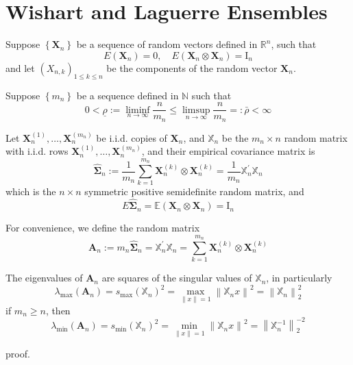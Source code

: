 \chapter{Wishart and Laguerre Ensembles}

Suppose $\left\{\mathbf{X}_{n}\right\}$ be a sequence of random vectors defined in $\mathbb{R}^{n}$, such that
\begin{equation}
    E\left(\mathbf{X}_{n}\right)=0,\quad E\left(\mathbf{X}_{n} \otimes \mathbf{X}_{n}\right)=\mathrm{I}_{n}
\end{equation}
and let $\left(X_{n,k}\right)_{1\leq k\leq n}$ be the components of the random vector $\mathbf{X}_{n}$.

Suppose $\left\{m_{n}\right\}$ be a sequence defined in $\mathbb{N}$ such that
\begin{equation}
    0<\underline{\rho}:=\liminf_{n\rightarrow\infty}\frac{n}{m_{n}}\leq\limsup_{n\rightarrow\infty}\frac{n}{m_{n}}=:\bar{\rho}<\infty
\end{equation}

Let $\mathbf{X}_{n}^{(1)},\ldots,\mathbf{X}_{n}^{\left(m_{n}\right)}$ be i.i.d. copies of $\mathbf{X}_{n}$, and $\mathbb{X}_{n}$ be the $m_{n}\times n$ random matrix with i.i.d. rows $\mathbf{X}_{n}^{(1)},\ldots,\mathbf{X}_{n}^{\left(m_{n}\right)}$, and their empirical covariance matrix is
\begin{equation}
    \widehat{\boldsymbol{\Sigma}}_{n}:=\frac{1}{m_{n}}\sum_{k=1}^{m_{n}}\mathbf{X}_{n}^{(k)}\otimes \mathbf{X}_{n}^{(k)}=\frac{1}{m_{n}}\mathbb{X}_{n}^{\prime}\mathbb{X}_{n}
\end{equation}
which is the $n\times n$ symmetric positive semidefinite random matrix, and
\begin{equation}
    E\widehat{\boldsymbol{\Sigma}}_{n}=\mathbb{E}\left(\mathbf{X}_{n}\otimes\mathbf{X}_{n}\right)=\mathrm{I}_{n}
\end{equation}

For convenience, we define the random matrix
\begin{equation}
    \mathbf{A}_{n}:=m_{n}\widehat{\boldsymbol{\Sigma}}_{n}=\mathbb{X}_{n}^{\prime}\mathbb{X}_{n}=\sum_{k=1}^{m_{n}}\mathbf{X}_{n}^{(k)}\otimes\mathbf{X}_{n}^{(k)}
\end{equation}

\begin{theorem}
    The eigenvalues of $\mathbf{A}_{n}$ are squares of the singular values of $\mathbb{X}_{n}$, in particularly
    \begin{equation}
        \lambda_{\max}\left(\mathbf{A}_{n}\right)=s_{\max}\left(\mathbb{X}_{n}\right)^{2}=\max_{\|x\|=1}\left\|\mathbb{X}_{n}x\right\|^{2}=\left\|\mathbb{X}_{n}\right\|_{2}^{2}
    \end{equation}
    if $m_{n}\geq n$, then
    \begin{equation}
        \lambda_{\min}\left(\mathbf{A}_{n}\right)=s_{\min}\left(\mathbb{X}_{n}\right)^{2}=\min_{\|x\|=1}\left\|\mathbb{X}_{n}x\right\|^{2}=\left\|\mathbb{X}_{n}^{-1}\right\|_{2}^{-2}
    \end{equation}
\end{theorem}
\begin{remark}
    proof.
\end{remark}

